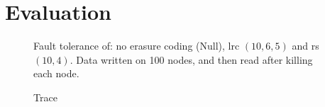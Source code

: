 \section{Evaluation}
\label{sec:evaluation}

\begin{figure}
    \centering
    
    \caption{Fault tolerance of: no erasure coding (Null), \acl{lrc} $\left(10,6,5\right)$ and \acl{rs} $\left(10,4\right)$. Data written on 100 nodes, and then read after killing each node.}
    \label{fig:checksum-plot}
\end{figure}

\begin{figure*}
    \centering
    
    \caption{Trace}
    \label{fig:trace-plot}
\end{figure*}
